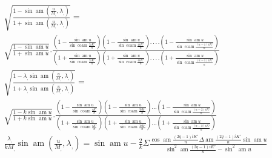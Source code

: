 \documentclass{article}
\begin{document}
\[
\begin{gathered}
\sqrt{\frac{1-\sin\operatorname{am}\left(\frac{u}{M_{,}},\lambda_{,}\right)}{1+\sin\operatorname{am}\left(\frac{u}{M_{,}},\lambda_{,}\right)}}=\\[2.5ex]
\sqrt{\frac{1-\sin\operatorname{am}u}{1+\sin\operatorname{am}u}}.\frac{\left(1-\frac{\sin\operatorname{am}u}{\sin\operatorname{coam}\frac{2iK'}{n}}\right)\left(1-\frac{\sin\operatorname{am}u}{\sin\operatorname{coam}\frac{4iK'}{n}}\right).\,.\,.\,.\left(1-\frac{\sin\operatorname{am}u}{\sin\operatorname{coam}\frac{(n-1)iK'}{n}}\right)}{\left(1+\frac{\sin\operatorname{am}u}{\sin\operatorname{coam}\frac{2iK'}{n}}\right)\left(1+\frac{\sin\operatorname{am}u}{\sin\operatorname{coam}\frac{4iK'}{n}}\right).\,.\,.\,.\left(1+\frac{\sin\operatorname{am}u}{\sin\operatorname{coam}\frac{(n-1)iK'}{n}}\right)}\\[2.5ex]
\sqrt{\frac{1-\lambda_{,}\sin\operatorname{am}\left(\frac{u}{M_{,}},\lambda_{,}\right)}{1+\lambda_{,}\sin\operatorname{am}\left(\frac{u}{M_{,}},\lambda_{,}\right)}}=\\[2.5ex]
\sqrt{\frac{1-k\sin\operatorname{am}u}{1+k\sin\operatorname{am}u}}.\frac{\left(1-\frac{\sin\operatorname{am}u}{\sin\operatorname{coam}\frac{iK'}{n}}\right)\left(1-\frac{\sin\operatorname{am}u}{\sin\operatorname{coam}\frac{3iK'}{n}}\right)\ldots\left(1-\frac{\sin\operatorname{am}u}{\sin\operatorname{coam}\frac{(n-2)iK'}{n}}\right)}{\left(1+\frac{\sin\operatorname{am}u}{\sin\operatorname{coam}\frac{iK'}{n}}\right)\left(1+\frac{\sin\operatorname{am}u}{\sin\operatorname{coam}\frac{3iK'}{n}}\right)\ldots\left(1+\frac{\sin\operatorname{am}u}{\sin\operatorname{coam}\frac{(n-2)iK'}{n}}\right)}\\[2.5ex]
\frac{\lambda_{,}}{kM_{,}}\sin\operatorname{am}\left(\frac{u}{M_{,}},\lambda_{,}\right)=\sin\operatorname{am}u-\frac{2}{k}\Sigma\frac{\cos\operatorname{am}\frac{(2q-1)iK'}{n}\Delta\operatorname{am}\frac{(2q-1)iK'}{n}\sin\operatorname{am}u}{\sin^{2}\operatorname{am}\frac{(2q-1)iK'}{n}-\sin^{2}\operatorname{am}u}
\end{gathered}
\]
\end{document}
